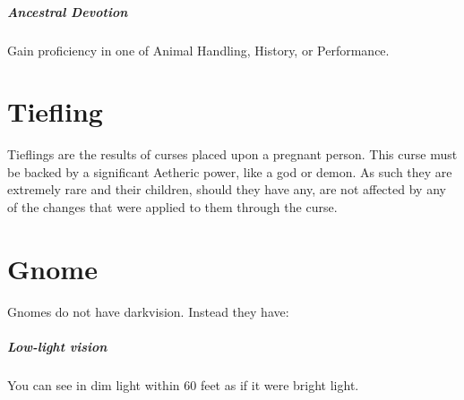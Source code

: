 \subparagraph{Ancestral Devotion}
Gain proficiency in one of Animal Handling, History, or Performance.


\section{Tiefling}
Tieflings are the results of curses placed upon a pregnant person.
This curse must be backed by a significant Aetheric power, like a god or demon.
As such they are extremely rare and their children, should they have any, are not affected by any of the changes that were applied to them through the curse.


\section{Gnome}
Gnomes do not have darkvision.
Instead they have:

\subparagraph{Low-light vision}
You can see in dim light within 60 feet as if it were bright light.
